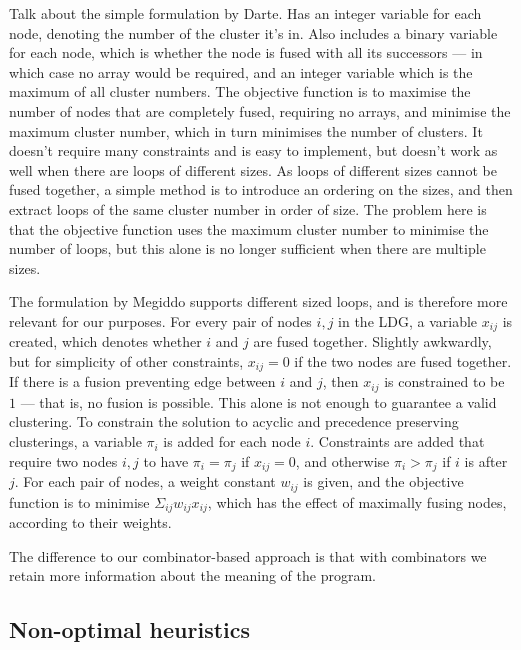 Talk about the simple formulation by Darte\cite{darte2002new}.
Has an integer variable for each node, denoting the number of the cluster it's in.
Also includes a binary variable for each node, which is whether the node is fused with all its successors --- in which case no array would be required, and an integer variable which is the maximum of all cluster numbers.
The objective function is to maximise the number of nodes that are completely fused, requiring no arrays, and minimise the maximum cluster number, which in turn minimises the number of clusters.
It doesn't require many constraints and is easy to implement, but doesn't work as well when there are loops of different sizes.
As loops of different sizes cannot be fused together, a simple method is to introduce an ordering on the sizes, and then extract loops of the same cluster number in order of size.
The problem here is that the objective function uses the maximum cluster number to minimise the number of loops, but this alone is no longer sufficient when there are multiple sizes.


The formulation by Megiddo\cite{megiddo1997optimal} supports different sized loops, and is therefore more relevant for our purposes.
For every pair of nodes $i,j$ in the LDG, a variable $x_{ij}$ is created, which denotes whether $i$ and $j$ are fused together.
Slightly awkwardly, but for simplicity of other constraints, $x_{ij} = 0$ if the two nodes are fused together.
If there is a fusion preventing edge between $i$ and $j$, then $x_{ij}$ is constrained to be $1$ --- that is, no fusion is possible.
This alone is not enough to guarantee a valid clustering.
To constrain the solution to acyclic and precedence preserving clusterings, a variable $\pi_i$ is added for each node $i$.
Constraints are added that require two nodes $i,j$ to have $\pi_i = \pi_j$ if $x_{ij} = 0$, and otherwise $\pi_i > \pi_j$ if $i$ is after $j$.
For each pair of nodes, a weight constant $w_{ij}$ is given, and the objective function is to minimise $\Sigma_{ij} w_{ij} x_{ij}$, which has the effect of maximally fusing nodes, according to their weights.

The difference to our combinator-based approach is that with combinators we retain more information about the meaning of the program.

\subsection{Non-optimal heuristics}

